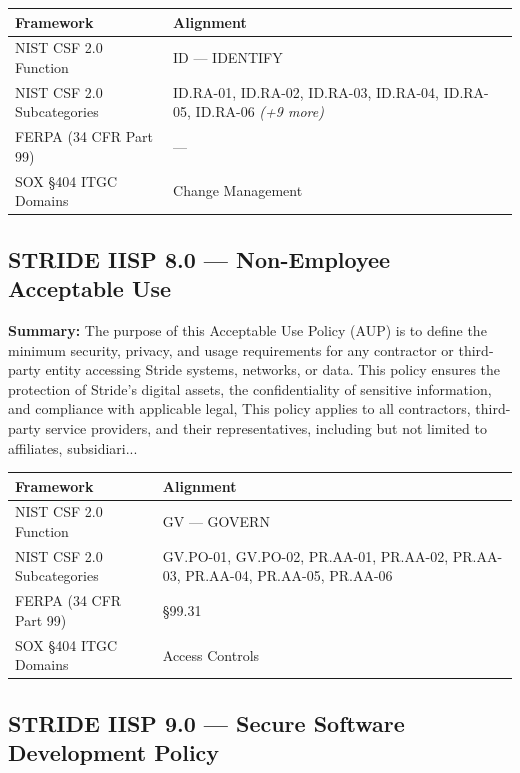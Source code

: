 \documentclass[11pt,landscape]{article}
\begin{document}
\begin{tabularx}{\textwidth}{|p{4cm}|X|}
\hline
\rowcolor{headgray} \textbf{Framework} & \textbf{Alignment} \\
\hline
NIST CSF 2.0 Function & ID --- IDENTIFY \\
\hline
NIST CSF 2.0 Subcategories & ID.RA-01, ID.RA-02, ID.RA-03, ID.RA-04, ID.RA-05, ID.RA-06 \textit{(+9 more)} \\
\hline
FERPA (34 CFR Part 99) & --- \\
\hline
SOX §404 ITGC Domains & Change Management \\
\hline
\end{tabularx}


\subsection{\textcolor{strideblue}{STRIDE IISP 8.0} --- Non-Employee Acceptable Use}
\label{pol:IISP80}

\textbf{Summary:} The purpose of this Acceptable Use Policy (AUP) is to define the minimum security, privacy, and usage requirements for any contractor or third-party entity accessing Stride systems, networks, or data. This policy ensures the protection of Stride’s digital assets, the confidentiality of sensitive information, and compliance with applicable legal, This policy applies to all contractors, third-party service providers, and their representatives, including but not limited to affiliates, subsidiari...

\begin{tabularx}{\textwidth}{|p{4cm}|X|}
\hline
\rowcolor{headgray} \textbf{Framework} & \textbf{Alignment} \\
\hline
NIST CSF 2.0 Function & GV --- GOVERN \\
\hline
NIST CSF 2.0 Subcategories & GV.PO-01, GV.PO-02, PR.AA-01, PR.AA-02, PR.AA-03, PR.AA-04, PR.AA-05, PR.AA-06 \\
\hline
FERPA (34 CFR Part 99) & §99.31 \\
\hline
SOX §404 ITGC Domains & Access Controls \\
\hline
\end{tabularx}


\subsection{\textcolor{strideblue}{STRIDE IISP 9.0} --- Secure Software Development Policy}
\label{pol:IISP90}
\end{document}
